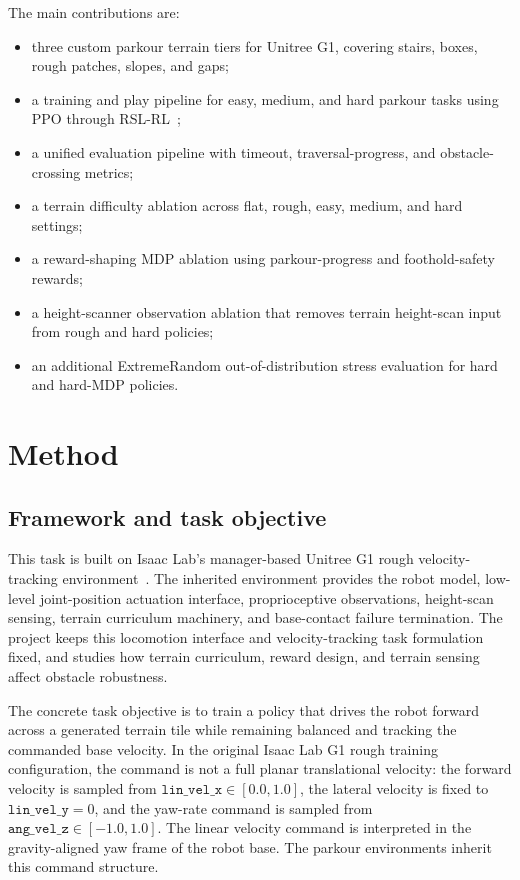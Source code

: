 \documentclass{article}
\begin{document}
The main contributions are:
\begin{itemize}[leftmargin=*,noitemsep,nolistsep,topsep=0pt]
    \item three custom parkour terrain tiers for Unitree G1, covering stairs, boxes, rough patches, slopes, and gaps;
    \item a training and play pipeline for easy, medium, and hard parkour tasks using PPO through RSL-RL~\citep{schulman2017proximal,rslrl};
    \item a unified evaluation pipeline with timeout, traversal-progress, and obstacle-crossing metrics;
    \item a terrain difficulty ablation across flat, rough, easy, medium, and hard settings;
    \item a reward-shaping MDP ablation using parkour-progress and foothold-safety rewards;
    \item a height-scanner observation ablation that removes terrain height-scan input from rough and hard policies;
    \item an additional ExtremeRandom out-of-distribution stress evaluation for hard and hard-MDP policies.
\end{itemize}


\section{Method}
\label{sec:method}

\subsection{Framework and task objective}

This task is built on Isaac Lab's manager-based Unitree G1 rough velocity-tracking environment~\citep{mittal2025isaaclab}. The inherited environment provides the robot model, low-level joint-position actuation interface, proprioceptive observations, height-scan sensing, terrain curriculum machinery, and base-contact failure termination. The project keeps this locomotion interface and velocity-tracking task formulation fixed, and studies how terrain curriculum, reward design, and terrain sensing affect obstacle robustness.

The concrete task objective is to train a policy that drives the robot forward across a generated terrain tile while remaining balanced and tracking the commanded base velocity. In the original Isaac Lab G1 rough training configuration, the command is not a full planar translational velocity: the forward velocity is sampled from
\(\texttt{lin\_vel\_x} \in [0.0, 1.0]\), the lateral velocity is fixed to
\(\texttt{lin\_vel\_y} = 0\), and the yaw-rate command is sampled from
\(\texttt{ang\_vel\_z} \in [-1.0, 1.0]\). The linear velocity command is interpreted in the gravity-aligned yaw frame of the robot base. The parkour environments inherit this command structure.
\end{document}
